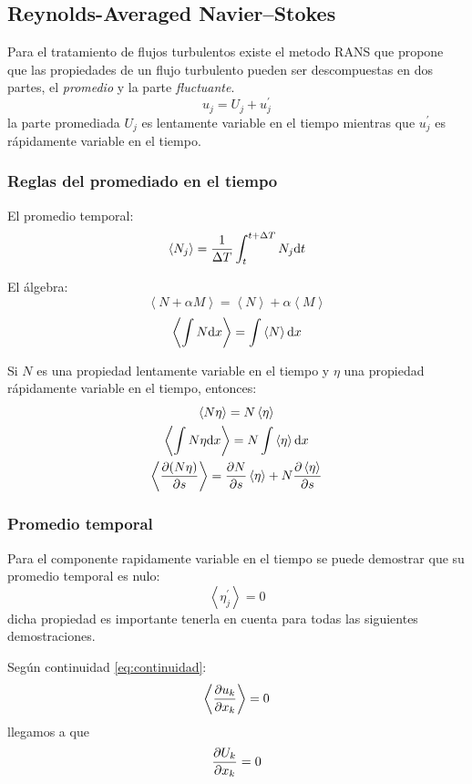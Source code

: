 \subsection{Reynolds-Averaged Navier--Stokes}
Para el tratamiento de flujos turbulentos existe el metodo RANS que propone que las propiedades de un flujo turbulento pueden ser descompuestas en dos partes, el \textit{promedio} y la parte \textit{fluctuante}. 
\[
u_j=U_j+u^\prime_j
\]
la parte promediada $U_j$ es lentamente variable en el tiempo mientras que $u^\prime_j$ es rápidamente variable en el tiempo. 
\subsubsection*{Reglas del promediado en el tiempo}
El promedio temporal:
\[
\left< N_j\right>=\frac{1}{\Delta T}\int_t^{t+\Delta T}N_j\textrm{d} t
\]

El álgebra:
\begin{equation}
\left<N +\alpha M \right>=\left< N\right> +\alpha \left< M \right>
\end{equation}
\[
\left< \int N \textrm{d} x \right> = \int \left< N \right> \textrm{d} x
\]

Si $N$ es una propiedad lentamente variable en el tiempo y $\eta$ una propiedad rápidamente variable en el tiempo, entonces:
\begin{gather}
\left< N\eta \right>=N \left< \eta \right> \\
\left< \int N \eta \textrm{d} x\right> = N \int \left< \eta \right> \textrm{d} x \\
\left< \frac{\partial (N\eta)}{\partial s} \right> = \frac{\partial N}{\partial s}\left< \eta \right> + N \frac{\partial \left< \eta \right>}{\partial s}
\end{gather}
\subsubsection*{Promedio temporal}
Para el componente rapidamente variable en el tiempo se puede demostrar que su promedio temporal es nulo:
\begin{equation} \label{eq:promediotemporalCompRapidVar}
    \left<\eta_j^\prime\right>= 0
\end{equation}
dicha propiedad es importante tenerla en cuenta para todas las siguientes demostraciones.

Según continuidad \eqref{eq:continuidad}:
\[
\left< \frac{\partial u_k}{\partial x_k}\right> =0
\]
llegamos a que 
\[
\frac{\partial U_k}{\partial x_k} =0
\]


